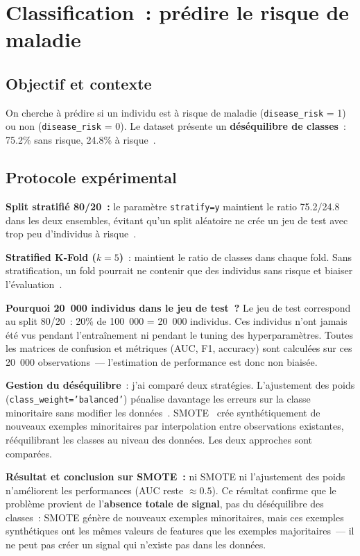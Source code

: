 \FloatBarrier

\section{Classification~: prédire le risque de maladie}

\subsection{Objectif et contexte}

On cherche à prédire si un individu est à risque de maladie (\texttt{disease\_risk} = 1) ou non (\texttt{disease\_risk} = 0). Le dataset présente un \textbf{déséquilibre de classes}~: 75.2\% sans risque, 24.8\% à risque~\cite{japkowicz2002}.

\subsection{Protocole expérimental}

\textbf{Split stratifié 80/20~:} le paramètre \texttt{stratify=y} maintient le ratio 75.2/24.8 dans les deux ensembles, évitant qu'un split aléatoire ne crée un jeu de test avec trop peu d'individus à risque~\cite{james2021}.

\textbf{Stratified K-Fold ($k=5$)}~: maintient le ratio de classes dans chaque fold. Sans stratification, un fold pourrait ne contenir que des individus sans risque et biaiser l'évaluation~\cite{japkowicz2002}.

\textbf{Pourquoi 20~000 individus dans le jeu de test~?} Le jeu de test correspond au split 80/20~: 20\% de 100~000 = 20~000 individus. Ces individus n'ont jamais été vus pendant l'entraînement ni pendant le tuning des hyperparamètres. Toutes les matrices de confusion et métriques (AUC, F1, accuracy) sont calculées sur ces 20~000 observations~--- l'estimation de performance est donc non biaisée.

\textbf{Gestion du déséquilibre}~: j'ai comparé deux stratégies. L'ajustement des poids (\texttt{class\_weight='balanced'}) pénalise davantage les erreurs sur la classe minoritaire sans modifier les données~\cite{japkowicz2002}. SMOTE~\cite{chawla2002} crée synthétiquement de nouveaux exemples minoritaires par interpolation entre observations existantes, rééquilibrant les classes au niveau des données. Les deux approches sont comparées.

\textbf{Résultat et conclusion sur SMOTE~:} ni SMOTE ni l'ajustement des poids n'améliorent les performances (AUC reste $\approx 0.5$). Ce résultat confirme que le problème provient de l'\textbf{absence totale de signal}, pas du déséquilibre des classes~: SMOTE génère de nouveaux exemples minoritaires, mais ces exemples synthétiques ont les mêmes valeurs de features que les exemples majoritaires~--- il ne peut pas créer un signal qui n'existe pas dans les données.


